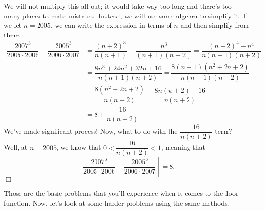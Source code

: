 \documentclass[../book.tex]{subfiles}
\begin{document}
\begin{solution}
We will not multiply this all out; it would take way too long and there's too many places to make mistakes.  Instead, we will use some algebra to simplify it.  If we let $n=2005$, we can write the expression in terms of $n$ and then simplify from there.  \begin{align*}
    \dfrac{2007^3}{2005 \cdot 2006}-\dfrac{2005^3}{2006\cdot 2007}&=\dfrac{(n+2)^3}{n(n+1)}-\dfrac{n^3}{(n+1)(n+2)}=\dfrac{(n+2)^4-n^4}{n(n+1)(n+2)} \\
    &=\dfrac{8n^3+24n^2+32n+16}{n(n+1)(n+2)}=\dfrac{8(n+1)(n^2+2n+2)}{n(n+1)(n+2)} \\
    &=\dfrac{8(n^2+2n+2)}{n(n+2)}=\dfrac{8n(n+2)+16}{n(n+2)} \\
    &=8+\dfrac{16}{n(n+2)} 
\end{align*}
We've made significant process!  Now, what to do with the $\dfrac{16}{n(n+2)}$ term? Well, at $n=2005$, we know that $0<\dfrac{16}{n(n+2)}<1$, meaning that $$\left\lfloor{\dfrac{2007^3}{2005 \cdot 2006}-\dfrac{2005^3}{2006\cdot 2007}}\right\rfloor=8.$$ $\Box$
\end{solution}
Those are the basic problems that you'll experience when it comes to the floor function.  Now, let's look at some harder problems using the same methods.
\end{document}
